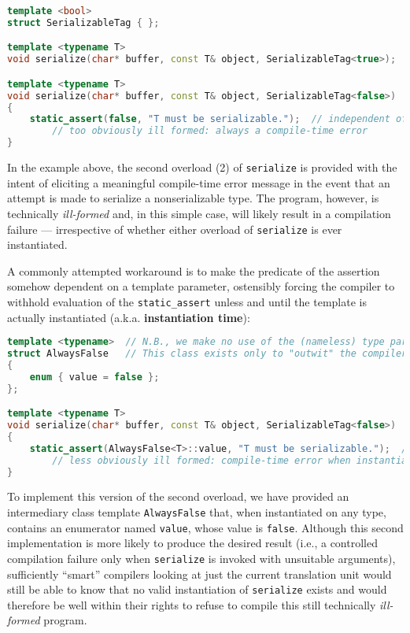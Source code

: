 \begin{lstlisting}[language=C++]
template <bool>
struct SerializableTag { };

template <typename T>
void serialize(char* buffer, const T& object, SerializableTag<true>);  // (1)

template <typename T>
void serialize(char* buffer, const T& object, SerializableTag<false>)  // (2)
{
    static_assert(false, "T must be serializable.");  // independent of (ù{\codeincomments{T}}ù)
        // too obviously ill formed: always a compile-time error
}
\end{lstlisting}
    
\noindent In the example above, the second overload (2) of \texttt{serialize} is
provided with the intent of eliciting a meaningful compile-time error
message in the event that an attempt is made to serialize a
nonserializable type. The program, however, is technically
\emph{ill-formed} and, in this simple case, will likely result in a
compilation failure --- irrespective of whether either overload of
\texttt{serialize} is ever instantiated. 

A commonly attempted workaround
is to make the predicate of the assertion somehow dependent on a
template parameter, ostensibly forcing the compiler to withhold
evaluation of the \texttt{static\_assert} unless and until the template
is actually instantiated (a.k.a. \textbf{instantiation time}):

\begin{lstlisting}[language=C++]
template <typename>  // N.B., we make no use of the (nameless) type parameter:
struct AlwaysFalse   // This class exists only to "outwit" the compiler.
{
    enum { value = false };
};

template <typename T>
void serialize(char* buffer, const T& object, SerializableTag<false>)  // (2)
{
    static_assert(AlwaysFalse<T>::value, "T must be serializable.");  // OK
        // less obviously ill formed: compile-time error when instantiated
}
\end{lstlisting}
    
\noindent To implement this version of the second overload, we have provided an
intermediary class template \texttt{AlwaysFalse} that, when instantiated
on any type, contains an enumerator named \texttt{value}, whose value is
\texttt{false}. Although this second implementation is more likely to
produce the desired result (i.e., a controlled compilation failure
only when \texttt{serialize} is invoked with unsuitable arguments),
sufficiently ``smart'' compilers looking at just the current translation
unit would still be able to know that no valid instantiation of
\texttt{serialize} exists and would therefore be well within their
rights to refuse to compile this still technically \emph{ill-formed}
program. 

